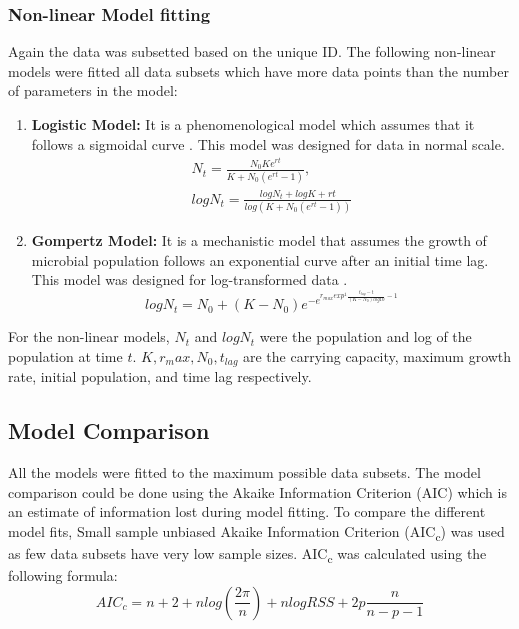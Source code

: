 \documentclass[11pt]{article}
\begin{document}
\subsubsection{Non-linear Model fitting}
Again the data was subsetted based on the unique ID. The following non-linear models were fitted all data subsets which have more data points than the number of parameters in the model:
\begin{enumerate}
    \item \textbf{Logistic Model:} It is a phenomenological model which assumes that  it follows a sigmoidal curve \cite{jason1983deterministic}. This model was designed for data in normal scale. 
    \begin{equation}
    \begin{split}
        N_{t} = \frac{N_{0}Ke^{rt}}{K+N_{0}(e^{rt}-1)},
        \\
        log N_{t} = \frac{log N_{t} + log K + rt}{log ({K + N_{0}(e^{rt}-1)})}
    \end{split}
    \label{Logi}
    \end{equation}
    \item \textbf{Gompertz Model:} It is a mechanistic model that assumes the growth of microbial population follows an exponential curve after an initial time lag. This model was designed for log-transformed data \cite{Zwietering1990-lp}.
    \begin{equation}
        log N_{t} = N_0 + (K - N_{0})e^{-e^{r_{max}exp^{1}\frac{t_{lag}-t}{(K-N_{0})log 10}-1}}
    \label{Gompy}
    \end{equation}
\end{enumerate}

For the non-linear models, $N_{t}$ and $log N_{t}$ were the population and log of the population at time $t$. $K, r_max, N_{0}, t_{lag}$ are the carrying capacity, maximum growth rate, initial population, and time lag respectively. 

\subsection{Model Comparison}
All the models were fitted to the maximum possible data subsets. The model comparison could be done using the Akaike Information Criterion (AIC) which is an estimate of information lost during model fitting. To compare the different model fits, Small sample unbiased Akaike Information Criterion (AIC\textsubscript{c}) \cite{JOHNSON2004101} was used as few data subsets have very low sample sizes. AIC\textsubscript{c} was calculated using the following formula: 
\begin{equation}
    AIC_{c} = n + 2 + n log (\frac{2\pi}{n}) + n log RSS + 2p\frac{n}{n-p-1}
\label{AIC}
\end{equation}
\end{document}
